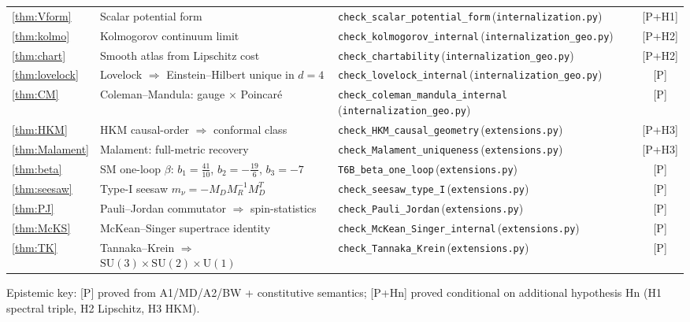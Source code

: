 \documentclass[11pt,a4paper]{article}
\theoremstyle{definition}
\newcommand{\SU}[1]{\mathrm{SU}(#1)}
\newcommand{\U}[1]{\mathrm{U}(#1)}
\newcommand{\coderef}[2]{\texttt{#1}\,(\texttt{#2})}
\begin{document}
\begin{center}
\begin{longtable}{@{}lp{6.8cm}lc@{}}
\ref{thm:Vform}    & Scalar potential form                           & \coderef{check\_scalar\_potential\_form}{internalization.py}     & [P+H1]\\
\ref{thm:kolmo}    & Kolmogorov continuum limit                      & \coderef{check\_kolmogorov\_internal}{internalization\_geo.py}   & [P+H2]\\
\ref{thm:chart}    & Smooth atlas from Lipschitz cost                & \coderef{check\_chartability}{internalization\_geo.py}           & [P+H2]\\
\ref{thm:lovelock} & Lovelock $\Rightarrow$ Einstein--Hilbert unique in $d=4$ & \coderef{check\_lovelock\_internal}{internalization\_geo.py}     & [P]\\
\ref{thm:CM}       & Coleman--Mandula: gauge $\times$ Poincaré       & \coderef{check\_coleman\_mandula\_internal}{internalization\_geo.py} & [P]\\
\ref{thm:HKM}      & HKM causal-order $\Rightarrow$ conformal class  & \coderef{check\_HKM\_causal\_geometry}{extensions.py}              & [P+H3]\\
\ref{thm:Malament} & Malament: full-metric recovery                  & \coderef{check\_Malament\_uniqueness}{extensions.py}               & [P+H3]\\
\ref{thm:beta}     & SM one-loop $\beta$: $b_1=\tfrac{41}{10}$, $b_2=-\tfrac{19}{6}$, $b_3=-7$ & \coderef{T6B\_beta\_one\_loop}{extensions.py}    & [P]\\
\ref{thm:seesaw}   & Type-I seesaw $m_\nu=-M_D M_R^{-1}M_D^T$        & \coderef{check\_seesaw\_type\_I}{extensions.py}                    & [P]\\
\ref{thm:PJ}       & Pauli--Jordan commutator $\Rightarrow$ spin-statistics & \coderef{check\_Pauli\_Jordan}{extensions.py}             & [P]\\
\ref{thm:McKS}     & McKean--Singer supertrace identity              & \coderef{check\_McKean\_Singer\_internal}{extensions.py}            & [P]\\
\ref{thm:TK}       & Tannaka--Krein $\Rightarrow$ $\SU{3}\times\SU{2}\times\U{1}$ & \coderef{check\_Tannaka\_Krein}{extensions.py}        & [P]\\
\bottomrule
\end{longtable}
\end{center}

\noindent Epistemic key: [P] proved from A1/MD/A2/BW + constitutive semantics; [P+Hn] proved conditional on additional hypothesis Hn (H1 spectral triple, H2 Lipschitz, H3 HKM).
\end{document}
